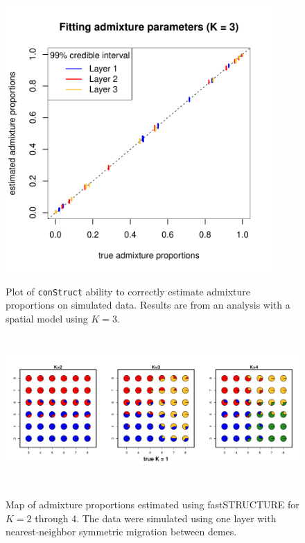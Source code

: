 \documentclass[10pt,letterpaper]{article}
\begin{document}
\begin{figure}
	\centering
		{\includegraphics[width=4in,height=4in]{figs/sims/simK3_adprop_fit.pdf}}
		\caption{
			Plot of \texttt{conStruct} ability to correctly estimate admixture proportions on simulated data.
			Results are from an analysis with a spatial model using $K=3$.
		}\label{simK3_adprop_fit}
\end{figure}

\begin{figure}
	\centering
		{\includegraphics[width=6in,height=2.25in]{figs/fastStr/fastStr_simK1_pies.pdf}}
	\caption{
	Map of admixture proportions estimated using fastSTRUCTURE \cite{fastStructure} for $K=2$ through 4.
	The data were simulated using one layer with nearest-neighbor symmetric migration between demes.
    }\label{fastStr_simK1}
\end{figure}
\end{document}
